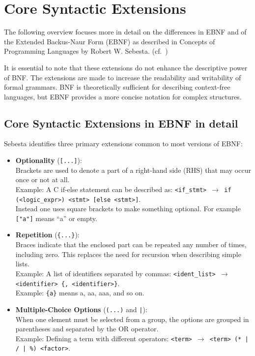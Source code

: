 \section{Core Syntactic Extensions}

The following overview focuses more in detail on the differences in EBNF and of the Extended Backus-Naur Form (EBNF) as described in Concepts of Programming Languages by Robert W. Sebesta. (cf.~\cite[pp.~149-151]{SebestaConceptsEdition})

It is essential to note that these extensions do not enhance the descriptive power of BNF. The extensions are made to increase the readability and writability of formal grammars. BNF is theoretically sufficient for describing context-free languages, but EBNF provides a more concise notation for complex structures.

\subsection{Core Syntactic Extensions in EBNF in detail}

Sebesta identifies three primary extensions common to most versions of EBNF:

\begin{itemize}
    \item \textbf{Optionality} (\texttt{[...]}): \\
    Brackets are used to denote a part of a right-hand side (RHS) that may occur once or not at all. \\
    Example: A C if-else statement can be described as: \texttt{<if\_stmt> $\rightarrow$ if (<logic\_expr>) <stmt> [else <stmt>]}. \\
    Instead one uses square brackets to make something optional. For example \texttt{["a"]} means ``a'' or empty.
    
    \item \textbf{Repetition} (\texttt{\{...\}}): \\
    Braces indicate that the enclosed part can be repeated any number of times, including zero. This replaces the need for recursion when describing simple lists. \\
    Example: A list of identifiers separated by commas: \texttt{<ident\_list> $\rightarrow$ <identifier> \{, <identifier>\}}. \\
    Example: \texttt{\{a\}} means a, aa, aaa, and so on.
    
    \item \textbf{Multiple-Choice Options} (\texttt{(...)} and \texttt{|}): \\
    When one element must be selected from a group, the options are grouped in parentheses and separated by the OR operator. \\
    Example: Defining a term with different operators: \texttt{<term> $\rightarrow$ <term> (* | / | \%) <factor>}.
\end{itemize}

